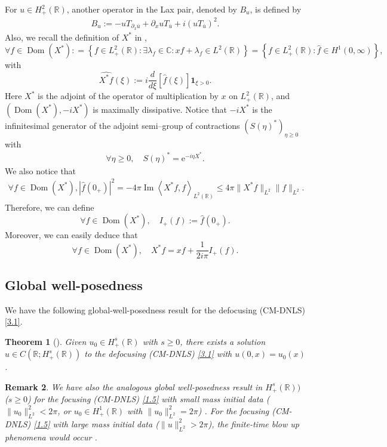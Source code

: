 \documentclass[10pt]{article}
\newtheorem{theorem}{Theorem}
\newtheorem{remark}[theorem]{Remark}
\numberwithin{equation}{section}
\numberwithin{theorem}{section}
\begin{document}
For $u \in H_{+}^2(\mathbb{R})$, another operator in the Lax pair, denoted by $B_u$, is defined by
\begin{align*}
B_u:=-u T_{\partial_x \bar{u}}+\partial_x u T_{\bar{u}}+i\left(u T_{\bar{u}}\right)^2.
\end{align*}
Also, we recall the definition of $X^{*}$ in \cite{1},
\begin{equation}
\label{1.51}
\forall f \in \operatorname{Dom}\left(X^{*}\right): =\left\{f \in L_{+}^2(\mathbb{R}): \exists \lambda_f \in \mathbb{C}: x f+\lambda_f \in L^2(\mathbb{R})\right\}= \left\{f \in L_{+}^{2}(\mathbb{R}):  \widehat{f} \in H^{1}(0, \infty)\right\}, 
\end{equation}
with
\[\widehat{X^{*} f}(\xi) :=i \frac{d}{d \xi}[\widehat{f}(\xi)] \mathbf{1}_{\xi>0}.\]
Here $X^{*}$ is the adjoint of the operator of multiplication by $x$ on $L_{+}^2(\mathbb{R})$, and $\left(\operatorname{Dom}\left(X^{*}\right), -iX^{*}\right)$ is maximally dissipative. Notice that $-iX^{*}$ is the infinitesimal generator of the adjoint semi–group of contractions $\left(S(\eta)^{*}\right)_{\eta \geq 0}$ with
\begin{align*}
\forall \eta \geq 0, \quad S(\eta)^{*}=\mathrm{e}^{-i \eta X^{*}}.
\end{align*}
We also notice that 
\begin{align*}
\forall f \in \operatorname{Dom}\left(X^{*}\right), \left|\widehat{f}\left(0_{+}\right)\right|^2 = -4\pi\operatorname{Im}\left\langle X^{*} f , f\right\rangle_{L^2(\mathbb{R})} \leq 4\pi \|X^{*}f\|_{L^2} \|f\|_{L^2}.
\end{align*}
Therefore, we can define
\begin{equation}
\label{1.121}
\forall f \in \operatorname{Dom}\left(X^{*}\right), \quad I_{+}(f):=\widehat{f}\left(0_{+}\right).
\end{equation}
Moreover, we can easily deduce that
\begin{equation}
\label{1.9}
\forall f \in \operatorname{Dom}\left(X^*\right), \quad X^* f=x f+\frac{1}{2 i \pi} I_{+}(f).
\end{equation}

\subsection{Global well-posedness}
We have the following global-well-posedness result for the defocusing (CM-DNLS) \eqref{3.1}.
\begin{theorem}[\cite{5,2}]
Given $u_0 \in H_{+}^s(\mathbb{R})$ with $s\geq 0$, there exists a solution $u \in C(\mathbb{R}; H_{+}^s(\mathbb{R}))$ to the defocusing (CM-DNLS) \eqref{3.1} with $u(0,x) = u_0(x)$.
\end{theorem}
\begin{remark}
We have also the analogous global well-posedness result in $H_{+}^s(\mathbb{R}))$ ($s\geq 0$) for the focusing (CM-DNLS) \eqref{1.5} with small mass initial data ($\|u_0\|_{L^2}^2 < 2\pi$, or $u_0 \in H_{+}^1(\mathbb{R})$ with $\|u_0\|_{L^2}^2 = 2\pi$) \cite{5,2}. For the focusing (CM-DNLS) \eqref{1.5} with large mass initial data ($\|u\|_{L^2}^2 > 2\pi$), the finite-time blow up phenomena would occur \cite{10,56,59,67}.
\end{remark}
\end{document}
